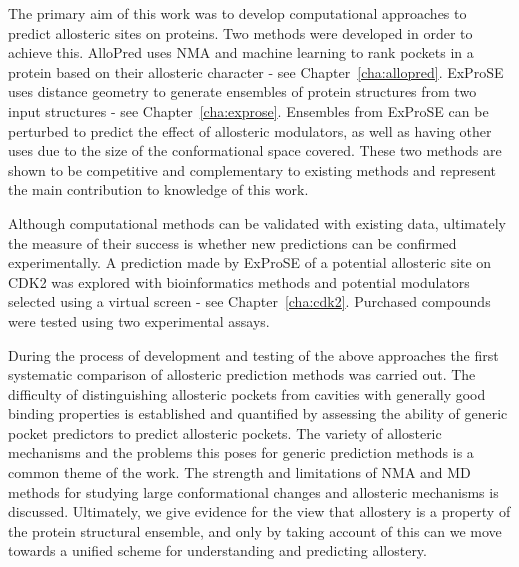 The primary aim of this work was to develop computational approaches to predict allosteric sites on proteins.
Two methods were developed in order to achieve this.
AlloPred uses NMA and machine learning to rank pockets in a protein based on their allosteric character - see Chapter~\ref{cha:allopred}.
ExProSE uses distance geometry to generate ensembles of protein structures from two input structures - see Chapter~\ref{cha:exprose}.
Ensembles from ExProSE can be perturbed to predict the effect of allosteric modulators, as well as having other uses due to the size of the conformational space covered.
These two methods are shown to be competitive and complementary to existing methods and represent the main contribution to knowledge of this work.

Although computational methods can be validated with existing data, ultimately the measure of their success is whether new predictions can be confirmed experimentally.
A prediction made by ExProSE of a potential allosteric site on CDK2 was explored with bioinformatics methods and potential modulators selected using a virtual screen - see Chapter~\ref{cha:cdk2}.
Purchased compounds were tested using two experimental assays.

During the process of development and testing of the above approaches the first systematic comparison of allosteric prediction methods was carried out.
The difficulty of distinguishing allosteric pockets from cavities with generally good binding properties is established and quantified by assessing the ability of generic pocket predictors to predict allosteric pockets.
The variety of allosteric mechanisms \cite{Motlagh2014} and the problems this poses for generic prediction methods is a common theme of the work.
The strength and limitations of NMA and MD methods for studying large conformational changes and allosteric mechanisms is discussed.
Ultimately, we give evidence for the view that allostery is a property of the protein structural ensemble, and only by taking account of this can we move towards a unified scheme for understanding and predicting allostery.
